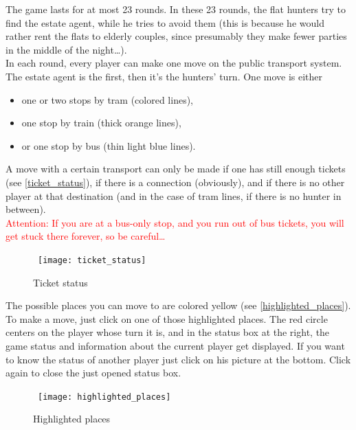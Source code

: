  The game lasts for at most 23 rounds. In these 23 rounds, the flat hunters try to find the estate agent, while he tries to avoid them (this is because he would rather rent the flats to elderly couples, since presumably they make fewer parties in the middle of the night\ldots).\\

In each round, every player can make one move on the public transport system. The estate agent is the first, then it's the hunters' turn. One move is either 

\begin{itemize}
  \item  one or two stops by tram (colored lines),
  \item  one stop by train (thick orange lines),
  \item  or one stop by bus (thin light blue lines).
\end{itemize}

A move with a certain transport can only be made if one has still enough tickets (see \autoref{ticket_status}), if there is a connection (obviously), and if there is no other player at that destination (and in the case of tram lines, if there is no hunter in between).\\

 \textcolor{red}{Attention: If you are at a bus-only stop, and you run out of bus tickets, you will get stuck there forever, so be careful\ldots}\\

\begin{figure}[h]
  \centerline{\hbox{
    \texttt{[image: ticket\_status]}
  }}
\caption{Ticket status}
\label{ticket_status}
\end{figure}

The possible places you can move to are colored yellow (see \autoref{highlighted_places}). To make a move, just click on one of those highlighted places. The red circle centers on the player whose turn it is, and in the status box at the right, the game status and information about the current player get displayed. If you want to know the status of another player just click on his picture at the bottom. Click again to close the just opened status box.\\

\begin{figure}[h]
  \centerline{\hbox{
    \texttt{[image: highlighted\_places]}
  }}
\caption{Highlighted places}
\label{highlighted_places}
\end{figure}

